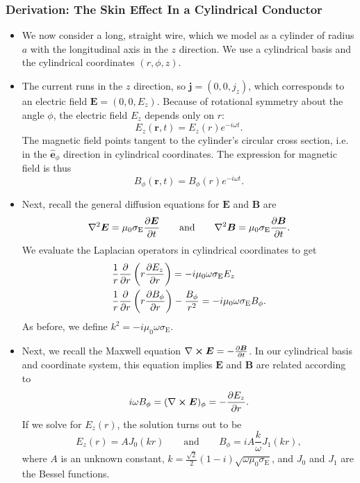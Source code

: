 \documentclass[11pt, a4paper]{article}
\newcommand{\eqtext}[1]{\qquad \text{#1} \qquad}
\renewcommand{\vec}[1]{\bm{#1}} %
\newcommand{\uvec}[1]{\hat{\vec{#1}}} %
\renewcommand{\r}{\vec{r}}
\newcommand{\E}{\vec{E}} %
\newcommand{\B}{\vec{B}} %
\newcommand{\mm}{\mu_{0}}  %
\renewcommand{\j}{\vec{j}}  %
\renewcommand{\curl}{\nabla \cross}
\renewcommand{\laplacian}{\nabla^{2}}
\begin{document}
\subsubsection{Derivation: The Skin Effect In a Cylindrical Conductor}
\begin{itemize}
	\item We now consider a long, straight wire, which we model as a cylinder of radius $ a $ with the longitudinal axis in the $ z $ direction. We use a cylindrical basis and the cylindrical coordinates $ (r, \phi, z) $. 
	
	\item The current runs in the $ z $ direction, so $ \j = (0, 0, j_{z}) $, which corresponds to an electric field $ \E = (0, 0, E_{z}) $. Because of rotational symmetry about the angle $ \phi $, the electric field $ E_{z} $ depends only on $ r $:
	\begin{equation*}
		E_{z}(\r, t) = E_{z}(r)e^{-i\omega t}.
	\end{equation*}
	The magnetic field points tangent to the cylinder's circular cross section, i.e. in the $ \uvec{e}_{\phi} $ direction in cylindrical coordinates. The expression for magnetic field is thus
	\begin{equation*}
		B_{\phi}(\r, t) = B_{\phi}(r)e^{-i\omega t}.
	\end{equation*}
	
    \item Next, recall the general diffusion equations for $ \E $ and $ \B $ are
	\begin{equation*}
		\laplacian \E = \mm \sigma_{\text{E}}\pdv{\E}{t} \eqtext{and} \laplacian \B = \mm \sigma_{\text{E}} \pdv{\B}{t}.
	\end{equation*}
	We evaluate the Laplacian operators in cylindrical coordinates to get
	\begin{align*}
		& \frac{1}{r}\pdv{r}\left(r\pdv{E_{z}}{r}\right)  = -i \mm \omega \sigma_{\text{E}}E_{z} \\
		& \frac{1}{r}\pdv{r}\left(r\pdv{B_{\phi}}{r}\right) - \frac{B_{\phi}}{r^{2}} = -i \mm \omega \sigma_{\text{E}}B_{\phi}.
	\end{align*}
	As before, we define $ k^{2} = -i\mm \omega \sigma_{\text{E}} $. 

    \item Next, we recall the Maxwell equation $ \curl \E = - \pdv{\B}{t} $. In our cylindrical basis and coordinate system, this equation implies $ \E $ and $ \B $ are related according to
	\begin{equation*}
		i \omega B_{\phi} = (\curl \E)_{\phi} = -\pdv{E_{z}}{r}.
	\end{equation*}
	If we solve for $ E_{z}(r) $, the solution turns out to be
	\begin{equation*}
		E_{z}(r) = A J_{0}(kr) \eqtext{and} B_{\phi} = i A \frac{k}{\omega} J_{1}(kr),
	\end{equation*}
	where $ A $ is an unknown constant, $ k = \frac{\sqrt{2}}{2}(1- i)\sqrt{\omega \mm \sigma_{\text{E}}} $,	and $ J_{0} $ and $ J_{1} $ are the Bessel functions.
	

\end{itemize}
\end{document}
